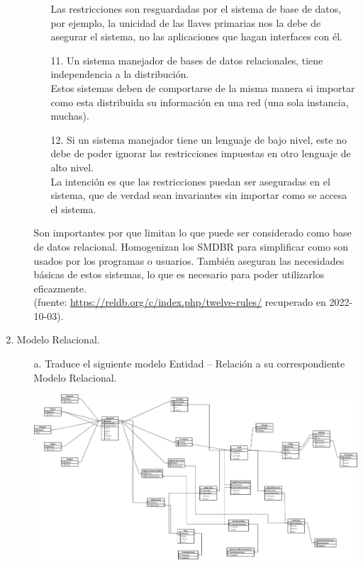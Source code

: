 \documentclass[12pt,a4paper]{article}
\begin{document}
\begin{enumerate}
\begin{enumerate}
\begin{enumerate}
						Las restricciones son resguardadas por el sistema de base de datos,
						por ejemplo, la unicidad de las llaves primarias nos la debe
						de asegurar el sistema, no las aplicaciones que hagan interfaces
						con él.\\

					\item[11.] Un sistema manejador de bases de datos relacionales, tiene
						independencia a la distribución.\\

						Estos sistemas deben de comportarse de la misma manera si importar
						como esta distribuida su información en una red (una sola instancia, muchas).\\

					\item[12.] Si un sistema manejador tiene un lenguaje de bajo nivel,
						este no debe de poder ignorar las restricciones impuestas en
						otro lenguaje de alto nivel.\\

						La intención es que las restricciones puedan ser aseguradas
						en el sistema, que de verdad sean invariantes sin importar
						como se accesa el sistema.\\
				\end{enumerate}

				Son importantes por que limitan lo que puede ser considerado como base de datos relacional.
				Homogenizan los SMDBR para simplificar como son usados por los programas o usuarios.
				También aseguran las necesidades básicas de estos sistemas, lo que es necesario
				para poder utilizarlos eficazmente.\\

				(fuente: \url{https://reldb.org/c/index.php/twelve-rules/} recuperado en 2022-10-03).\\
		\end{enumerate}

	\item Modelo Relacional.
		\begin{enumerate}
			\item[a.] Traduce el siguiente modelo Entidad – Relación a su correspondiente Modelo Relacional.

				\includegraphics[scale=0.1]{../Diagramas/Ejercicio2a.jpg}
		\end{enumerate}


\end{enumerate}
\end{document}
